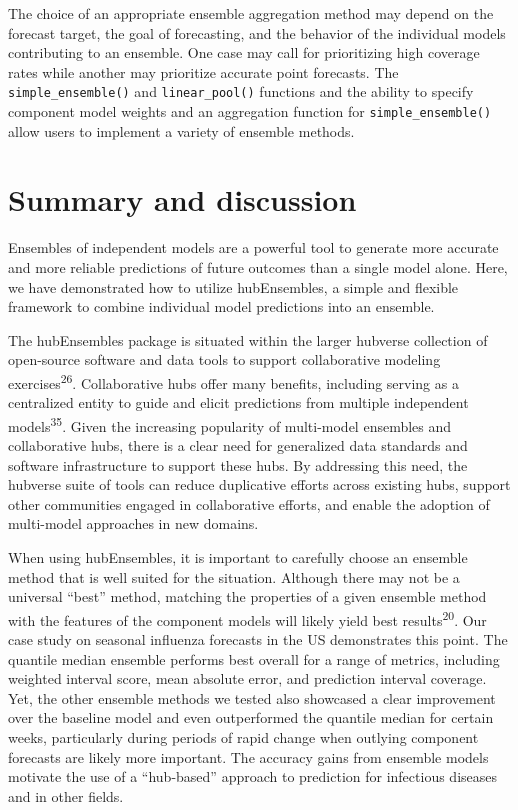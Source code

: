 \documentclass[
  letterpaper,
  DIV=11,
  numbers=noendperiod]{scrartcl}
\begin{document}
The choice of an appropriate ensemble aggregation method may depend on
the forecast target, the goal of forecasting, and the behavior of the
individual models contributing to an ensemble. One case may call for
prioritizing high coverage rates while another may prioritize accurate
point forecasts. The \texttt{simple\_ensemble()} and
\texttt{linear\_pool()} functions and the ability to specify component
model weights and an aggregation function for
\texttt{simple\_ensemble()} allow users to implement a variety of
ensemble methods.

\section{Summary and discussion}\label{sec-conclusions}

Ensembles of independent models are a powerful tool to generate more
accurate and more reliable predictions of future outcomes than a single
model alone. Here, we have demonstrated how to utilize {hubEnsembles}, a
simple and flexible framework to combine individual model predictions
into an ensemble.

The {hubEnsembles} package is situated within the larger hubverse
collection of open-source software and data tools to support
collaborative modeling exercises\textsuperscript{26}. Collaborative hubs
offer many benefits, including serving as a centralized entity to guide
and elicit predictions from multiple independent
models\textsuperscript{35}. Given the increasing popularity of
multi-model ensembles and collaborative hubs, there is a clear need for
generalized data standards and software infrastructure to support these
hubs. By addressing this need, the hubverse suite of tools can reduce
duplicative efforts across existing hubs, support other communities
engaged in collaborative efforts, and enable the adoption of multi-model
approaches in new domains.

When using {hubEnsembles}, it is important to carefully choose an
ensemble method that is well suited for the situation. Although there
may not be a universal ``best'' method, matching the properties of a
given ensemble method with the features of the component models will
likely yield best results\textsuperscript{20}. Our case study on
seasonal influenza forecasts in the US demonstrates this point. The
quantile median ensemble performs best overall for a range of metrics,
including weighted interval score, mean absolute error, and prediction
interval coverage. Yet, the other ensemble methods we tested also
showcased a clear improvement over the baseline model and even
outperformed the quantile median for certain weeks, particularly during
periods of rapid change when outlying component forecasts are likely
more important. The accuracy gains from ensemble models motivate the use
of a ``hub-based'' approach to prediction for infectious diseases and in
other fields.
\end{document}
